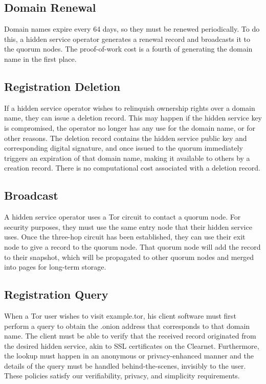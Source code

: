 \subsection{Domain Renewal}

Domain names expire every 64 days, so they must be renewed periodically. To do this, a hidden service operator generates a renewal record and broadcasts it to the quorum nodes. The proof-of-work cost is a fourth of generating the domain name in the first place.

\subsection{Registration Deletion}

If a hidden service operator wishes to relinquish ownership rights over a domain name, they can issue a deletion record. This may happen if the hidden service key is compromised, the operator no longer has any use for the domain name, or for other reasons. The deletion record contains the hidden service public key and corresponding digital signature, and once issued to the quorum immediately triggers an expiration of that domain name, making it available to others by a creation record. There is no computational cost associated with a deletion record. 

\subsection{Broadcast}

A hidden service operator uses a Tor circuit to contact a quorum node. For security purposes, they must use the same entry node that their hidden service uses. Once the three-hop circuit has been established, they can use their exit node to give a record to the quorum node. That quorum node will add the record to their snapshot, which will be propagated to other quorum nodes and merged into pages for long-term storage.

\subsection{Registration Query}

When a Tor user wishes to visit example.tor, his client software must first perform a query to obtain the .onion address that corresponds to that domain name. The client must be able to verify that the received record originated from the desired hidden service, akin to SSL certificates on the Clearnet. Furthermore, the lookup must happen in an anonymous or privacy-enhanced manner and the details of the query must be handled behind-the-scenes, invisibly to the user. These policies satisfy our verifiability, privacy, and simplicity requirements.

